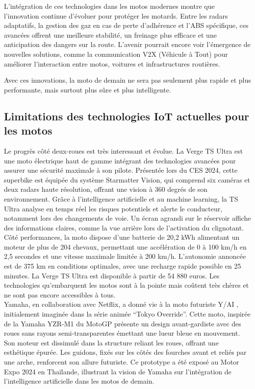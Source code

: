 \documentclass{article}
\begin{document}
L’intégration de ces technologies dans les motos modernes montre que l’innovation continue d’évoluer pour protéger les motards. Entre les radars adaptatifs, la gestion des gaz en cas de perte d’adhérence et l’ABS spécifique, ces avancées offrent une meilleure stabilité, un freinage plus efficace et une anticipation des dangers sur la route. L’avenir pourrait encore voir l’émergence de nouvelles solutions, comme la communication V2X (Véhicule à Tout) pour améliorer l’interaction entre motos, voitures et infrastructures routières.

Avec ces innovations, la moto de demain ne sera pas seulement plus rapide et plus performante, mais surtout plus sûre et plus intelligente. 

\subsection{Limitations des technologies IoT actuelles pour les motos}

Le progrès côté deux-roues est très interessant et évolue.
La Verge TS Ultra est une moto électrique \cite{lenoir_cette_2024} haut de gamme intégrant des technologies avancées pour assurer une sécurité maximale à son pilote. Présentée lors du CES 2024, cette superbike est équipée du système Starmatter Vision, qui comprend six caméras et deux radars haute résolution, offrant une vision à 360 degrés de son environnement. Grâce à l’intelligence artificielle et au machine learning, la TS Ultra analyse en temps réel les risques potentiels et alerte le conducteur, notamment lors des changements de voie. Un écran agrandi sur le réservoir affiche des informations claires, comme la vue arrière lors de l’activation du clignotant. Côté performances, la moto dispose d’une batterie de 20,2 kWh alimentant un moteur de plus de 204 chevaux, permettant une accélération de 0 à 100 km/h en 2,5 secondes et une vitesse maximale limitée à 200 km/h. L’autonomie annoncée est de 375 km en conditions optimales, avec une recharge rapide possible en 25 minutes. La Verge TS Ultra est disponible à partir de 54 880 euros.
Les technologies qu'embarquent les motos sont à la pointe mais coûtent très chères et ne sont pas encore accessibles à tous.
\\
Yamaha, en collaboration avec Netflix, a donné vie à la moto futuriste Y/AI \cite{texier_quand_2024} , initialement imaginée dans la série animée “Tokyo Override”. Cette moto, inspirée de la Yamaha YZR-M1 du MotoGP présente un design avant-gardiste avec des roues sans rayons semi-transparentes émettant une lueur bleue en mouvement. Son moteur est dissimulé dans la structure reliant les roues, offrant une esthétique épurée. Les guidons, fixés sur les côtés des fourches avant et reliés par une arche, renforcent son allure futuriste. Ce prototype a été exposé au Motor Expo 2024 en Thaïlande, illustrant la vision de Yamaha sur l’intégration de l’intelligence artificielle dans les motos de demain.
\end{document}
